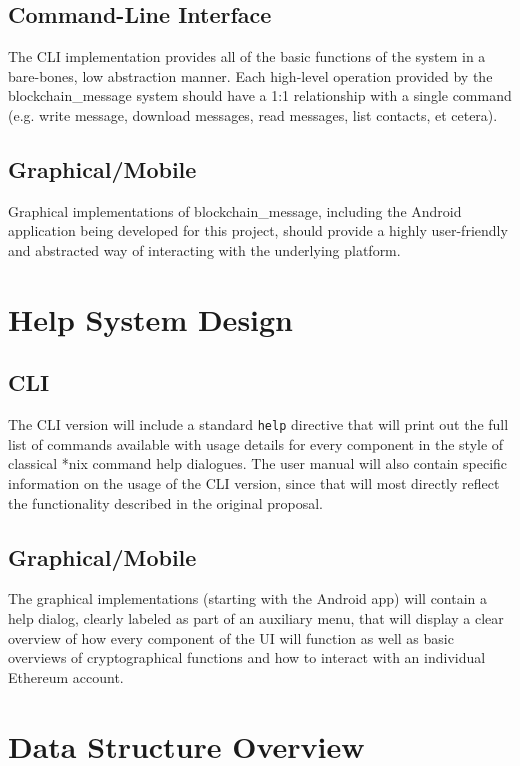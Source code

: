 \documentclass[titlepage]{report}
\begin{document}
\subsection{Command-Line Interface}
The CLI implementation provides all of the basic functions of the system in a bare-bones, low abstraction manner. Each high-level operation provided by the blockchain\_message system should have a 1:1 relationship with a single command (e.g. write message, download messages, read messages, list contacts, et cetera).

\subsection{Graphical/Mobile}
Graphical implementations of blockchain\_message, including the Android application being developed for this project, should provide a highly user-friendly and abstracted way of interacting with the underlying platform.

\section{Help System Design}

\subsection{CLI}
The CLI version will include a standard \verb|help| directive that will print out the full list of commands available with usage details for every component in the style of classical *nix command help dialogues. The user manual will also contain specific information on the usage of the CLI version, since that will most directly reflect the functionality described in the original proposal.

\subsection{Graphical/Mobile}
The graphical implementations (starting with the Android app) will contain a help dialog, clearly labeled as part of an auxiliary menu, that will display a clear overview of how every component of the UI will function as well as basic overviews of cryptographical functions and how to interact with an individual \gls{Ethereum} account.

\section{Data Structure Overview}
\end{document}
